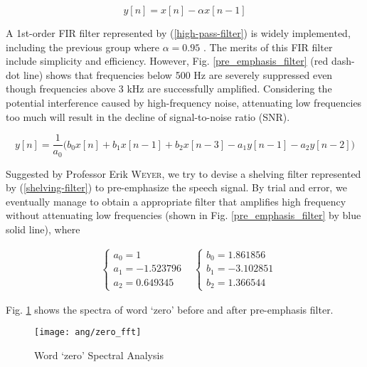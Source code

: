 \begin{equation}
\label{high-pass-filter}
y[n] = x[n] - \alpha x[n-1]
\end{equation}

A 1st-order FIR filter represented by (\ref{high-pass-filter}) is widely implemented, including the previous group where $\alpha = 0.95$ \cite{EVW-report}. The merits of this FIR filter include simplicity and efficiency. However, Fig. \ref{pre_emphasis_filter} (red dash-dot line) shows that frequencies below 500 Hz are severely suppressed even though frequencies above 3 kHz are successfully amplified. Considering the potential interference caused by high-frequency noise, attenuating low frequencies too much will result in the decline of signal-to-noise ratio (SNR).

\begin{equation}
\label{shelving-filter}
y[n] = \frac{1}{a_0} \Big( b_0 x[n] + b_1 x[n-1] + b_2 x[n-3] - a_1 y[n-1] - a_2 y[n-2] \Big)
\end{equation}

Suggested by Professor Erik \textsc{Weyer}, we try to devise a shelving filter represented by (\ref{shelving-filter}) to pre-emphasize the speech signal. By trial and error, we eventually manage to obtain a appropriate filter that amplifies high frequency without attenuating low frequencies (shown in Fig. \ref{pre_emphasis_filter} by blue solid line), where

\begin{align}
\label{shleving-coef}
&\begin{cases}
a_0 = 1\\
a_1 = -1.523796\\
a_2 = 0.649345
\end{cases}
&\begin{cases}
b_0 = 1.861856\\
b_1 = -3.102851\\
b_2 = 1.366544
\end{cases}
\end{align}

Fig. \ref{zero_fft} shows the spectra of word `zero' before and after pre-emphasis filter.

\begin{figure}[H]
\centering
\texttt{[image: ang/zero\_fft]}
\caption{Word `zero' Spectral Analysis}
\label{zero_fft}
\end{figure}


